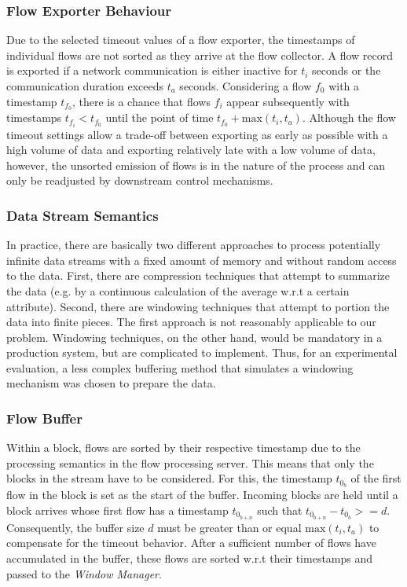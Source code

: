 \documentclass[conference]{IEEEtran}
\begin{document}
\subsubsection{Flow Exporter Behaviour}\label{sec:flow_exporter_behaviour}
Due to the selected timeout values of a flow exporter, the timestamps of individual flows are not sorted as they arrive at the flow collector. A flow record is exported if a network communication is either inactive for $t_i$ seconds or the communication duration exceeds $t_a$ seconds. Considering a flow $f_0$ with a timestamp $t_{f_0}$, there is a chance that flows $f_i$ appear subsequently with timestamps $t_{f_i} < t_{f_0}$ until the point of time $t_{f_0} + \text{max}(t_i, t_a)$. Although the flow timeout settings allow a trade-off between exporting as early as possible with a high volume of data and exporting relatively late with a low volume of data, however, the unsorted emission of flows is in the nature of the process and can only be readjusted by downstream control mechanisms.

\subsubsection{Data Stream Semantics}\label{sec:data_stream_semantics}
In practice, there are basically two different approaches to process potentially infinite data streams with a fixed amount of memory and without random access to the data. First, there are compression techniques that attempt to summarize the data (e.g. by a continuous calculation of the average w.r.t a certain attribute). Second, there are windowing techniques that attempt to portion the data into finite pieces. The first approach is not reasonably applicable to our problem. Windowing techniques, on the other hand, would be mandatory in a production system, but are complicated to implement. Thus, for an experimental evaluation, a less complex buffering method that simulates a windowing mechanism was chosen to prepare the data.

\subsubsection{Flow Buffer}\label{sec:flow_buffer}
Within a block, flows are sorted by their respective timestamp due to the processing semantics in the flow processing server. This means that only the blocks in the stream have to be considered. For this, the timestamp $t_{0_{b}}$ of the first flow in the block is set as the start of the buffer. Incoming blocks are held until a block arrives whose first flow has a timestamp $t_{0_{b+n}}$ such that $t_{0_{b+n}} - t_{0_{b}} >= d$. Consequently, the buffer size $d$ must be greater than or equal $\text{max}(t_i, t_a)$ to compensate for the timeout behavior. After a sufficient number of flows have accumulated in the buffer, these flows are sorted w.r.t their timestamps and passed to the \textit{Window Manager}.
\end{document}
